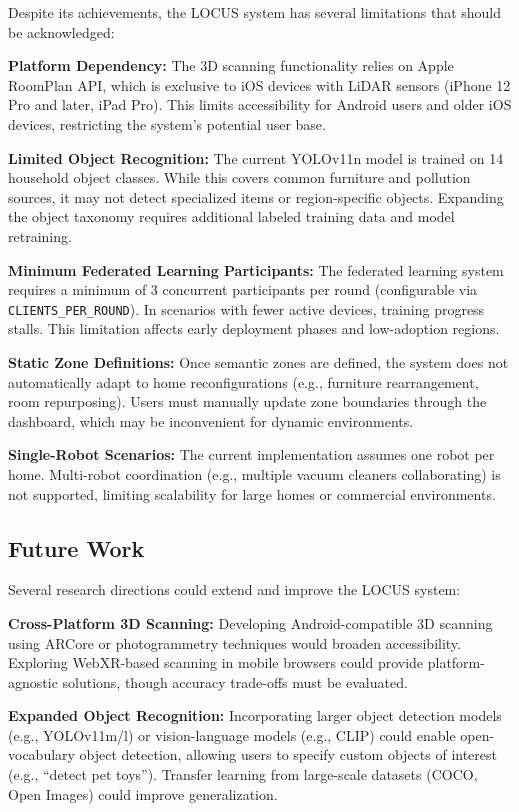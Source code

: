 \documentclass[conference]{IEEEtran}
\begin{document}
Despite its achievements, the LOCUS system has several limitations that should be acknowledged:

\textbf{Platform Dependency:} The 3D scanning functionality relies on Apple RoomPlan API, which is exclusive to iOS devices with LiDAR sensors (iPhone 12 Pro and later, iPad Pro). This limits accessibility for Android users and older iOS devices, restricting the system's potential user base.

\textbf{Limited Object Recognition:} The current YOLOv11n model is trained on 14 household object classes. While this covers common furniture and pollution sources, it may not detect specialized items or region-specific objects. Expanding the object taxonomy requires additional labeled training data and model retraining.

\textbf{Minimum Federated Learning Participants:} The federated learning system requires a minimum of 3 concurrent participants per round (configurable via \texttt{CLIENTS\_PER\_ROUND}). In scenarios with fewer active devices, training progress stalls. This limitation affects early deployment phases and low-adoption regions.

\textbf{Static Zone Definitions:} Once semantic zones are defined, the system does not automatically adapt to home reconfigurations (e.g., furniture rearrangement, room repurposing). Users must manually update zone boundaries through the dashboard, which may be inconvenient for dynamic environments.

\textbf{Single-Robot Scenarios:} The current implementation assumes one robot per home. Multi-robot coordination (e.g., multiple vacuum cleaners collaborating) is not supported, limiting scalability for large homes or commercial environments.

\subsection{Future Work}

Several research directions could extend and improve the LOCUS system:

\textbf{Cross-Platform 3D Scanning:} Developing Android-compatible 3D scanning using ARCore or photogrammetry techniques would broaden accessibility. Exploring WebXR-based scanning in mobile browsers could provide platform-agnostic solutions, though accuracy trade-offs must be evaluated.

\textbf{Expanded Object Recognition:} Incorporating larger object detection models (e.g., YOLOv11m/l) or vision-language models (e.g., CLIP) could enable open-vocabulary object detection, allowing users to specify custom objects of interest (e.g., ``detect pet toys''). Transfer learning from large-scale datasets (COCO, Open Images) could improve generalization.
\end{document}
